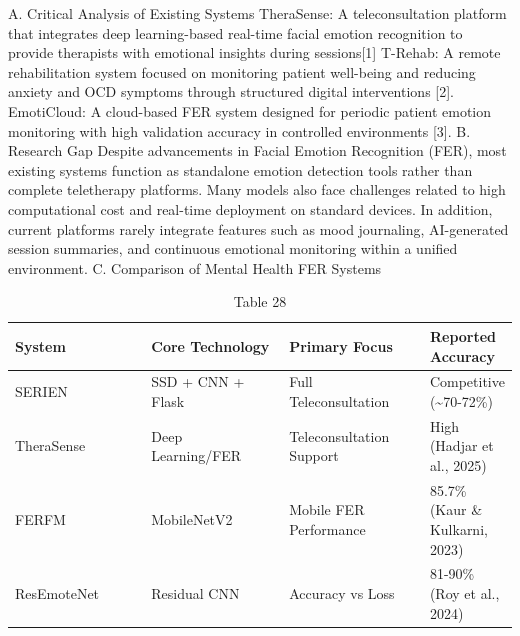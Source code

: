 \documentclass[conference]{IEEEtran}
\begin{document}
A. Critical Analysis of Existing Systems
TheraSense: A teleconsultation platform that integrates deep learning-based real-time facial emotion recognition to provide therapists with emotional insights during sessions[1]
T-Rehab: A remote rehabilitation system focused on monitoring patient well-being and reducing anxiety and OCD symptoms through structured digital interventions [2].
EmotiCloud: A cloud-based FER system designed for periodic patient emotion monitoring with high validation accuracy in controlled environments [3].
B. Research Gap
Despite advancements in Facial Emotion Recognition (FER), most existing systems function as standalone emotion detection tools rather than complete teletherapy platforms. Many models also face challenges related to high computational cost and real-time deployment on standard devices. In addition, current platforms rarely integrate features such as mood journaling, AI-generated session summaries, and continuous emotional monitoring within a unified environment.
C. Comparison of Mental Health FER Systems
\begin{table}[t]
\centering
\caption{Table 28}
\begin{tabular}{|p{0.3\linewidth}|p{0.3\linewidth}|p{0.3\linewidth}|p{0.3\linewidth}|}
\hline
System & Core Technology & Primary Focus & Reported Accuracy \\
\hline
SERIEN & SSD + CNN + Flask & Full Teleconsultation & Competitive (\textasciitilde{}70-72\%) \\
\hline
TheraSense & Deep Learning/FER & Teleconsultation Support & High (Hadjar et al., 2025) \\
\hline
FERFM & MobileNetV2 & Mobile FER Performance & 85.7\% (Kaur \& Kulkarni, 2023) \\
\hline
ResEmoteNet & Residual CNN & Accuracy vs Loss & 81-90\% (Roy et al., 2024) \\
\hline
\end{tabular}
\end{table}
\end{document}
